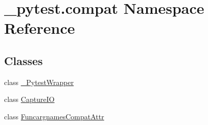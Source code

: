 \hypertarget{namespace__pytest_1_1compat}{}\section{\+\_\+pytest.\+compat Namespace Reference}
\label{namespace__pytest_1_1compat}
\subsection*{Classes}
\begin{DoxyCompactItemize}
\item 
class \hyperlink{class__pytest_1_1compat_1_1___pytest_wrapper}{\+\_\+\+Pytest\+Wrapper}
\item 
class \hyperlink{class__pytest_1_1compat_1_1_capture_i_o}{Capture\+IO}
\item 
class \hyperlink{class__pytest_1_1compat_1_1_funcargnames_compat_attr}{Funcargnames\+Compat\+Attr}
\end{DoxyCompactItemize}
